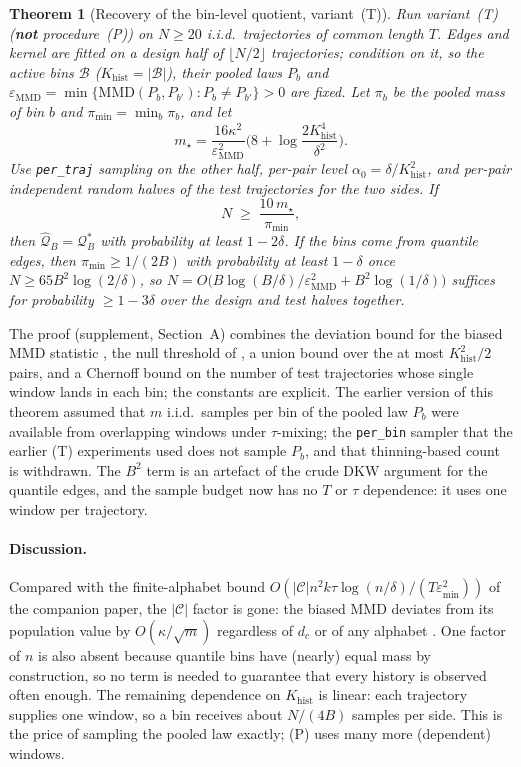 \documentclass[10pt]{article}
\newtheorem{theorem}{Theorem}
\newcommand{\calQ}{\mathcal{Q}}
\newcommand{\calC}{\mathcal{C}}
\newcommand{\calB}{\mathcal{B}}
\newcommand{\epsMMD}{\varepsilon_{\mathrm{MMD}}}
\newcommand{\epsmin}{\varepsilon_{\min}}
\newcommand{\Qstar}{\mathcal{Q}^*}
\newcommand{\mmd}{\mathrm{MMD}}
\newcommand{\Khist}{K_{\mathrm{hist}}}
\begin{document}
\begin{theorem}[Recovery of the bin-level quotient, variant~(T)]
\label{thm:main}
Run variant~(T) (\textbf{not} procedure~(P)) on $N\ge20$ i.i.d.\ trajectories of
common length $T$.  Edges and kernel are fitted on a design half of $\lfloor
N/2\rfloor$ trajectories; condition on it, so the active bins $\calB$
($\Khist=|\calB|$), their pooled laws $P_b$ and
$\epsMMD=\min\{\mmd(P_b,P_{b'}):P_b\ne P_{b'}\}>0$ are fixed.  Let $\pi_b$ be the
pooled mass of bin $b$ and $\pi_{\min}=\min_b\pi_b$, and let
\[
  m_\star=\frac{16\kappa^2}{\epsMMD^2}\Big(8+\log\frac{2\Khist^4}{\delta^2}\Big).
\]
Use \texttt{per\_traj} sampling on the other half, per-pair level
$\alpha_0=\delta/\Khist^2$, and per-pair independent random halves of the test
trajectories for the two sides.  If
\begin{equation}
  N\;\ge\;\frac{10\,m_\star}{\pi_{\min}},
  \label{eq:bound}
\end{equation}
then $\widehat{\calQ}_B=\Qstar_B$ with probability at least $1-2\delta$.  If the bins
come from quantile edges, then $\pi_{\min}\ge1/(2B)$ with probability at least
$1-\delta$ once $N\ge65B^2\log(2/\delta)$, so
$N=O\!\big(B\log(B/\delta)/\epsMMD^2+B^2\log(1/\delta)\big)$ suffices for
probability $\ge1-3\delta$ over the design and test halves together.
\end{theorem}

The proof (supplement, Section~A) combines the deviation bound for the biased
MMD statistic \citep[Thm.~7]{Gretton2012}, the null threshold of
\citet[Cor.~9]{Gretton2012}, a union bound over the at most $\Khist^2/2$
pairs, and a Chernoff bound on the number of test trajectories whose single
window lands in each bin; the constants are explicit.  The earlier version of
this theorem assumed that $m$ i.i.d.\ samples per bin of the pooled law $P_b$ were
available from overlapping windows under $\tau$-mixing; the \texttt{per\_bin}
sampler that the earlier (T) experiments used does not sample $P_b$, and that
thinning-based count is withdrawn.  The $B^2$ term is an artefact of the crude
DKW argument for the quantile edges, and the sample budget now has no $T$
or $\tau$ dependence: it uses one window per trajectory.

\paragraph{Discussion.}
Compared with the finite-alphabet bound
$O(|\calC|n^2k\tau\log(n/\delta)/(T\epsmin^2))$ of the companion paper, the
$|\calC|$ factor is gone: the biased MMD deviates from its population value by
$O(\kappa/\sqrt m)$ regardless of $d_c$ or of any alphabet
\citep[Thm.~7]{Gretton2012}.  One factor of $n$ is also absent because quantile
bins have (nearly) equal mass by construction, so no term is needed to guarantee that
every history is observed often enough.  The remaining dependence on $\Khist$
is linear: each trajectory supplies one window, so a bin receives about
$N/(4B)$ samples per side.  This is the price of sampling the pooled law
exactly; (P) uses many more (dependent) windows.
\end{document}
